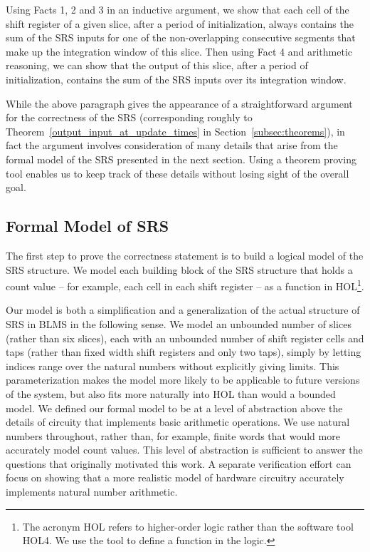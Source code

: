 \documentclass{llncs}
\begin{document}
Using Facts 1, 2 and 3 in an inductive argument, we show that each cell of the shift register of a given slice, after a period of initialization, always contains the sum of the SRS inputs for one of the non-overlapping consecutive segments that make up the integration window of this slice.
Then using Fact 4 and arithmetic reasoning, we can show that the output of this slice, after a period of initialization, contains the sum of the SRS inputs over its integration window.

While the above paragraph gives the appearance of a straightforward argument for the correctness of the SRS (corresponding roughly to Theorem~\ref{output_input_at_update_times} in Section~\ref{subsec:theorems}), in fact the argument involves consideration of many details that arise from the formal model of the SRS presented in the next section.
Using a theorem proving tool enables us to keep track of these details without losing sight of the overall goal.

\subsection{Formal Model of SRS}
The first step to prove the correctness statement is to build a logical model of the SRS structure.
We model each building block of the SRS structure that holds a count value -- for example, each cell in each shift register -- as a function in HOL\footnote{The acronym HOL refers to higher-order logic rather than the software tool HOL4.
We use the tool to define a function in the logic.}.

Our model is both a simplification and a generalization of the actual structure of SRS in BLMS in the following sense.
We model an unbounded number of slices (rather than six slices), each with an unbounded number of shift register cells and taps (rather than fixed width shift registers and only two taps), simply by letting indices range over the natural numbers without explicitly giving limits.
This parameterization makes the model more likely to be applicable to future versions of the system, but also fits more naturally into HOL than would a bounded model.
We defined our formal model to be at a level of abstraction above the details of circuity that implements basic arithmetic operations.
We use natural numbers throughout, rather than, for example, finite words that would more accurately model count values.
This level of abstraction is sufficient to answer the questions that originally motivated this work.
A separate verification effort can focus on showing that a more realistic model of hardware circuitry accurately implements natural number arithmetic.
\end{document}
